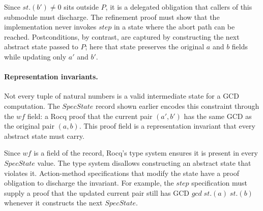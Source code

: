 \documentclass[fontset=fira-newtxsf]{mitthesis}
\theoremstyle{definition}
\theoremstyle{plain}
\begin{document}
Since $\mathit{st}.(\mathit{b'}) \neq 0$ sits outside $P$, it is a delegated obligation that callers of this submodule must discharge.
The refinement proof must show that the implementation never invokes $\mathit{step}$ in a state where the abort path can be reached.
Postconditions, by contrast, are captured by constructing the next abstract state passed to $\mathit{P}$; here that state preserves the original $\mathit{a}$ and $\mathit{b}$ fields while updating only $\mathit{a'}$ and $\mathit{b'}$.

\paragraph{Representation invariants.}
Not every tuple of natural numbers is a valid intermediate state for a GCD computation.
The $\mathit{SpecState}$ record shown earlier encodes this constraint through the $\mathit{wf}$ field: a Rocq proof that the current pair $(\mathit{a'}, \mathit{b'})$ has the same GCD as the original pair $(\mathit{a}, \mathit{b})$.
This proof field is a representation invariant that every abstract state must carry.

Since $\mathit{wf}$ is a field of the record, Rocq's type system ensures it is present in every $\mathit{SpecState}$ value. The type system disallows constructing an abstract state that violates it.
Action-method specifications that modify the state have a proof obligation to discharge the invariant.
For example, the $\mathit{step}$ specification must supply a proof that the updated current pair still has GCD $\mathit{gcd}\;\mathit{st}.(\mathit{a})\;\mathit{st}.(\mathit{b})$ whenever it constructs the next $\mathit{SpecState}$.
\end{document}
